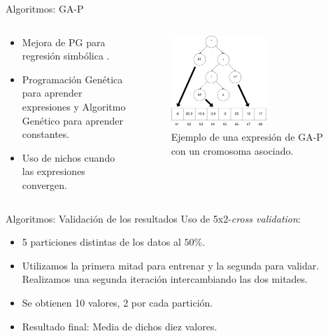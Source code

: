 \documentclass{beamer}
\begin{document}
\begin{frame}{Algoritmos: GA-P}

	\begin{columns}[T]

		\begin{column}{.4\textwidth}
			\begin{itemize}
				\item Mejora de PG para regresión simbólica \cite{primerGAP}.
				\item Programación Genética para aprender expresiones y Algoritmo Genético para aprender constantes.
				\item Uso de nichos cuando las expresiones convergen.
			\end{itemize}
		\end{column}


		\begin{column}{.6\textwidth}
			\begin{figure}[H]
				\centering
				\includegraphics[width=0.6\textwidth]{expresion_gap.png}
				\caption{Ejemplo de una expresión de GA-P con un cromosoma asociado.}
				\label{fig:expresion_gap}
			\end{figure}
		\end{column}

	\end{columns}


\end{frame}

\begin{frame}{Algoritmos: Validación de los resultados}
	Uso de 5x2-\textit{cross validation}:

	\begin{itemize}
		\item 5 particiones distintas de los datos al $50\%$.
		\item Utilizamos la primera mitad para entrenar y la segunda para validar. Realizamos una segunda iteración intercambiando las dos mitades.
		\item Se obtienen 10 valores, 2 por cada partición.
		\item Resultado final: Media de dichos diez valores.
	\end{itemize}

\end{frame}
\end{document}

